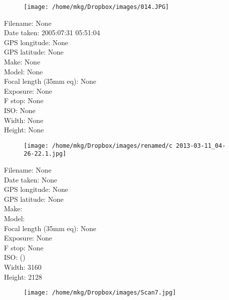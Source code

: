 \clearpage
\recalctypearea
\newpage
\noindent
\begin{figure}
    \texttt{[image: /home/mkg/Dropbox/images/014.JPG]}
    \captionlistentry[figure]{\url{\protect\detokenize{}}}
\end{figure}

\clearpage
\recalctypearea
\newpage
\noindent
Filename: None\\ 
Date taken: 2005:07:31 05:51:04\\ 
GPS longitude: None\\ 
GPS latitude: None\\ 
Make: None\\ 
Model: None\\ 
Focal length (35mm eq): None\\ 
Exposure: None\\ 
F stop: None\\ 
ISO: None\\ 
Width: None\\ 
Height: None\\ 

\clearpage
\recalctypearea
\newpage
\noindent
\begin{figure}
    \texttt{[image: /home/mkg/Dropbox/images/renamed/c 2013-03-11\_04-26-22.1.jpg]}
\end{figure}

\clearpage
\recalctypearea
\newpage
\noindent
Filename: None\\ 
Date taken: None\\ 
GPS longitude: None\\ 
GPS latitude: None\\ 
Make: \\ 
Model: \\ 
Focal length (35mm eq): None\\ 
Exposure: None\\ 
F stop: None\\ 
ISO: ()\\ 
Width: 3160\\ 
Height: 2128\\ 

\clearpage
\recalctypearea
\newpage
\noindent
\begin{figure}
    \texttt{[image: /home/mkg/Dropbox/images/Scan7.jpg]}
\end{figure}

